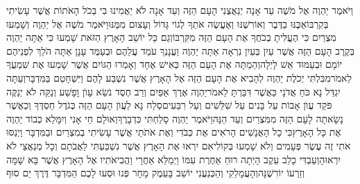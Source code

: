 \documentclass[../main/main.tex]{subfiles}
\begin{document}
\begin{multicols}{\ncols}
וַיֹּאמֶר יַהְוֶה אֶל מֹשֶׁה עַד אָנָה יְנַאֲצֻנִי הָעָם הַזֶּה וְעַד אָנָה לֹא יַאֲמִינוּ בִי בְּכֹל הָאֹתוֹת אֲשֶׁר עָשִׂיתִי בְּקִרְבּוֹ\PreVerseSpace{}אַכֶּנּוּ בַדֶּבֶר וְאוֹרִשֶׁנּוּ וְאֶעֱשֶׂה אֹתְךָ לְגוֹי גָּדוֹל וְעָצוּם מִמֶּנּוּ\PreVerseSpace{}וַיֹּאמֶר מֹשֶׁה אֶל יַהְוֶה וְשָׁמְעוּ מִצְרַיִם כִּי הֶעֱלִיתָ בְכֹחֲךָ אֶת הָעָם הַזֶּה מִקִּרְבּוֹ\PreVerseSpace{}וְגַם כָּל\SubEnd{} יוֹשֵׁב הָאָרֶץ הַזֹּאת שָׁמְעוּ כִּי אַתָּה יַהְוֶה בְּקֶרֶב הָעָם הַזֶּה אֲשֶׁר עַיִן בְּעַיִן נִרְאָה אַתָּה יַהְוֶה וַעֲנָנְךָ עֹמֵד עֲלֵהֶם וּבְעַמֻּד עָנָן אַתָּה הֹלֵךְ לִפְנֵיהֶם יוֹמָם וּבְעַמּוּד אֵשׁ לָיְלָה\PreVerseSpace{}וְהֵמַתָּה אֶת הָעָם הַזֶּה כְּאִישׁ אֶחָד וְאָמְרוּ הַגּוֹיִם אֲשֶׁר שָׁמְעוּ אֶת שִׁמְעֲךָ לֵאמֹר\PreVerseSpace{}מִבִּלְתִּי יְכֹלֶת יַהְוֶה לְהָבִיא אֶת הָעָם הַזֶּה אֶל הָאָרֶץ אֲשֶׁר נִשְׁבַּע לָהֶם וַיִּשְׁחָטֵם בַּמִּדְבָּר\PreVerseSpace{}וְעַתָּה יִגְדַּל נָא כֹּחַ אֲדֹנָי כַּאֲשֶׁר דִּבַּרְתָּ לֵאמֹר\PreVerseSpace{}יַהְוֶה אֶרֶךְ אַפַּיִם וְרַב חֶסֶד נֹשֵׂא עָוֺן וָפָשַׁע וְנַקֵּה לֹא יְנַקֶּה פֹּקֵד עֲוֺן אָבוֹת עַל בָּנִים עַל שִׁלֵּשִׁים וְעַל רִבֵּעִים\PreVerseSpace{}סְלַח נָא לַעֲוֺן הָעָם הַזֶּה כְּגֹדֶל חַסְדֶּךָ וְכַאֲשֶׁר נָשָׂאתָה לָעָם הַזֶּה מִמִּצְרַיִם וְעַד הֵנָּה\PreVerseSpace{}וַיֹּאמֶר יַהְוֶה סָלַחְתִּי כִּדְבָרֶךָ\PreVerseSpace{}וְאוּלָם חַי אָנִי וְיִמָּלֵא כְבוֹד יַהְוֶה אֶת כָּל הָאָרֶץ\PreVerseSpace{}כִּי כָל הָאֲנָשִׁים הָרֹאִים אֶת כְּבֹדִי וְאֶת אֹתֹתַי אֲשֶׁר עָשִׂיתִי בְמִצְרַיִם וּבַמִּדְבָּר וַיְנַסּוּ אֹתִי זֶה עֶשֶׂר פְּעָמִים וְלֹא שָׁמְעוּ בְּקוֹלִי\PreVerseSpace{}אִם יִרְאוּ אֶת הָאָרֶץ אֲשֶׁר נִשְׁבַּעְתִּי לַאֲבֹתָם וְכָל מְנַאֲצַי לֹא יִרְאוּהָ\PreVerseSpace{}וְעַבְדִּי כָלֵב עֵקֶב הָיְתָה רוּחַ אַחֶרֶת עִמּוֹ וַיְמַלֵּא אַחֲרָי וַהֲבִיאֹתִיו אֶל הָאָרֶץ אֲשֶׁר בָּא שָׁמָּה וְזַרְעוֹ יוֹרִשֶׁנָּה\PreVerseSpace{}וְהָעֲמָלֵקִי וְהַכְּנַעֲנִי יוֹשֵׁב בָּעֵמֶק מָחָר פְּנוּ וּסְעוּ לָכֶם הַמִּדְבָּר דֶּרֶךְ יַם סוּף\OpenSection{}\par

\end{multicols}
\end{document}

